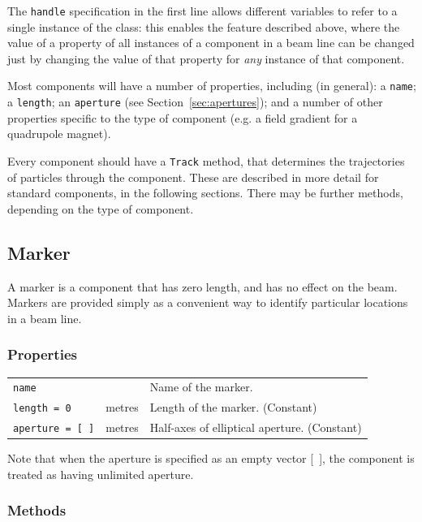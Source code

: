 \documentclass[11pt,twoside,a4paper]{article}
\begin{document}
The \texttt{handle} specification in the first line allows different variables to refer to
a single instance of the class: this enables the feature described above,
where the value of a property of all instances of a component in a beam line can be changed
just by changing the value of that property for \emph{any} instance of that component.

Most components will have a number of properties, including (in general): a \texttt{name};
a \texttt{length}; an \texttt{aperture} (see Section~\ref{sec:apertures});
and a number of other properties specific to the type of component (e.g. a field gradient
for a quadrupole magnet).

Every component should have a \texttt{Track} method, that determines the
trajectories of particles through the component.  These are described in more
detail for standard components, in the following sections.  There may be
further methods, depending on the type of component.


\subsection{Marker}

A marker is a component that has zero length, and has no effect on the beam.
Markers are provided simply as a convenient way to identify particular locations
in a beam line.

\subsubsection{Properties}

\begin{tabular}{|l|l|l|}
\hline
\texttt{name} & & Name of the marker. \\
\texttt{length = 0} & metres & Length of the marker. (Constant) \\
\texttt{aperture = [\,]} & metres & Half-axes of elliptical aperture. (Constant) \\
\hline
\end{tabular}
\vspace{0.2in}

Note that when the aperture is specified as an empty vector [\, ], the component
is treated as having unlimited aperture.

\subsubsection{Methods}
\end{document}

